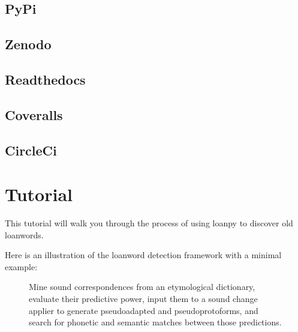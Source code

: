 \documentclass[letterpaper,10pt,english]{sphinxmanual}
\begin{document}
\section{PyPi}
\label{\detokenize{home:pypi}}
\sphinxAtStartPar
{}


\section{Zenodo}
\label{\detokenize{home:zenodo}}
\sphinxAtStartPar
{}


\section{Readthedocs}
\label{\detokenize{home:readthedocs}}
\sphinxAtStartPar
{}


\section{Coveralls}
\label{\detokenize{home:coveralls}}
\sphinxAtStartPar
{}


\section{CircleCi}
\label{\detokenize{home:circleci}}
\sphinxAtStartPar
{}

\sphinxstepscope


\chapter{Tutorial}
\label{\detokenize{tutorial:tutorial}}\label{\detokenize{tutorial::doc}}
\sphinxAtStartPar
This tutorial will walk you through the process of using loanpy to
discover old loanwords.

\sphinxAtStartPar
Here is an illustration of the loanword detection framework with a minimal
example:

\begin{figure}[htbp]
\centering
\capstart

\noindent{}
\caption{Mine sound
correspondences from an etymological dictionary, evaluate their predictive
power, input them to a sound change applier to generate pseudo\sphinxhyphen{}adapted and
pseudo\sphinxhyphen{}proto\sphinxhyphen{}forms, and search for phonetic and semantic matches between
those predictions.}\label{\detokenize{tutorial:id1}}\end{figure}
\end{document}
